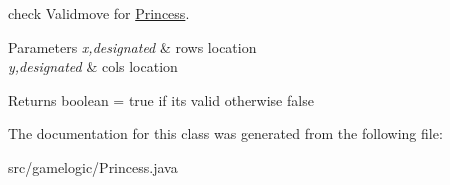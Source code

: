 check Validmove for \mbox{\hyperlink{classgamelogic_1_1_princess}{Princess}}. 
\begin{DoxyParams}{Parameters}
{\em x,designated} & row\textquotesingle{}s location \\
\hline
{\em y,designated} & col\textquotesingle{}s location \\
\hline
\end{DoxyParams}
\begin{DoxyReturn}{Returns}
boolean = true if it\textquotesingle{}s valid otherwise false 
\end{DoxyReturn}


The documentation for this class was generated from the following file\+:\begin{DoxyCompactItemize}
\item 
src/gamelogic/Princess.\+java\end{DoxyCompactItemize}
